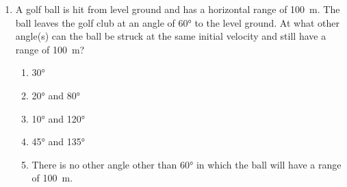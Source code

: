 \documentclass{../../oss-apphys}
\begin{document}
\begin{multicols}{2}
\begin{enumerate}[leftmargin=18pt]
  \item A golf ball is hit from level ground and has a horizontal range of
    \SI{100}{m}. The ball leaves the golf club at an angle of \ang{60} to the
    level ground. At what other angle(s) can the ball be struck at the same
    initial velocity and still have a range of \SI{100}{m}?
    \begin{center}
      \vspace{-.2in}
    \end{center}
    \begin{enumerate}[noitemsep,topsep=0pt,leftmargin=18pt,label=(\Alph*)]
    \item\ang{30}
    \item\ang{20} and \ang{80}
    \item\ang{10} and \ang{120}
    \item\ang{45} and \ang{135}
    \item There is no other angle other than \ang{60} in which the ball will
      have a range of \SI{100}{m}.
    \end{enumerate}
%  
%
%  
%    
%
%
    

\end{enumerate}
\end{multicols}
\end{document}
